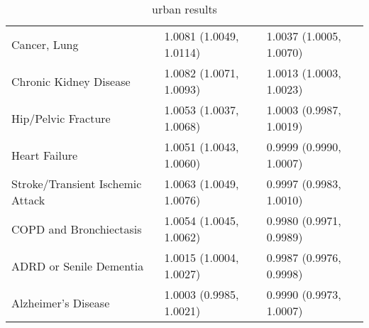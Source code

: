\begin{table}[ht]
\begin{tabular}{lll}
  Cancer, Lung & 1.0081 (1.0049, 1.0114) & 1.0037 (1.0005, 1.0070) \\ 
  Chronic Kidney Disease & 1.0082 (1.0071, 1.0093) & 1.0013 (1.0003, 1.0023) \\ 
  Hip/Pelvic Fracture & 1.0053 (1.0037, 1.0068) & 1.0003 (0.9987, 1.0019) \\ 
  Heart Failure & 1.0051 (1.0043, 1.0060) & 0.9999 (0.9990, 1.0007) \\ 
  Stroke/Transient Ischemic Attack & 1.0063 (1.0049, 1.0076) & 0.9997 (0.9983, 1.0010) \\ 
  COPD and Bronchiectasis & 1.0054 (1.0045, 1.0062) & 0.9980 (0.9971, 0.9989) \\ 
  ADRD or Senile Dementia & 1.0015 (1.0004, 1.0027) & 0.9987 (0.9976, 0.9998) \\ 
  Alzheimer's Disease & 1.0003 (0.9985, 1.0021) & 0.9990 (0.9973, 1.0007) \\ 
   \hline
\end{tabular}
\caption{urban results} 
\label{tab:stratified_OR_table_urban}
\end{table}

